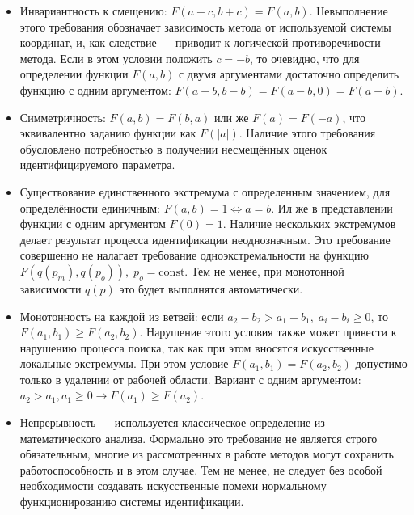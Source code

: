 \begin{itemize}

  \item
    Инвариантность к смещению:
    $F(a+c,b+c) = F(a,b)$.
    Невыполнение этого требования обозначает зависимость метода
    от используемой системы координат, и, как следствие --- приводит к логической
    противоречивости метода.
    Если в этом условии положить $c = -b$, то
    очевидно, что для определении функции $F(a,b)$ 
    с двумя аргументами достаточно определить функцию
    с одним аргументом: $ F(a-b,b-b) = F(a-b,0) = F(a-b)$.

  \item
    Симметричность: $ F(a,b) = F(b,a)$ или же $F(a) = F(-a)$,
    что эквивалентно заданию функции как $F(|a|)$.
    Наличие этого требования обусловлено потребностью в получении несмещённых
    оценок идентифицируемого параметра.

  \item
    Существование единственного экстремума с определенным значением, для определённости единичным:
    $F(a,b) = 1  \Leftrightarrow a = b $.
    Ил же в представлении функции с одним аргументом $F(0) = 1$.
    Наличие нескольких экстремумов делает результат процесса идентификации неоднозначным.
    Это требование совершенно не налагает требование одноэкстремальности
    на функцию $F(q(p_m), q(p_o)), \; p_o = \mathrm{const}$. Тем не менее, при
    монотонной зависимости $q(p)$ это будет выполнятся автоматически.

  \item
    Монотонность на каждой из ветвей:
    если $ a_2-b_2 > a_1-b_1, \; a_i-b_i \ge 0$, то $F(a_1,b_1) \ge F(a_2,b_2)$.
    Нарушение этого условия также может привести к нарушению процесса поиска,
    так как при этом вносятся искусственные локальные экстремумы.
    При этом условие $F(a_1,b_1) = F(a_2,b_2)$ допустимо только в удалении от
    рабочей области. Вариант с одним аргументом:
    $ a_2 > a_1, a_1 \ge 0 \to F(a_1) \ge F(a_2)$.

  \item
    Непрерывность --- используется классическое определение из математического анализа.
    Формально это требование не является строго обязательным, многие из рассмотренных
    в работе методов могут сохранить работоспособность и в этом случае. Тем не менее,
    не следует без особой необходимости создавать искусственные помехи нормальному функционированию
    системы идентификации.

\end{itemize}

